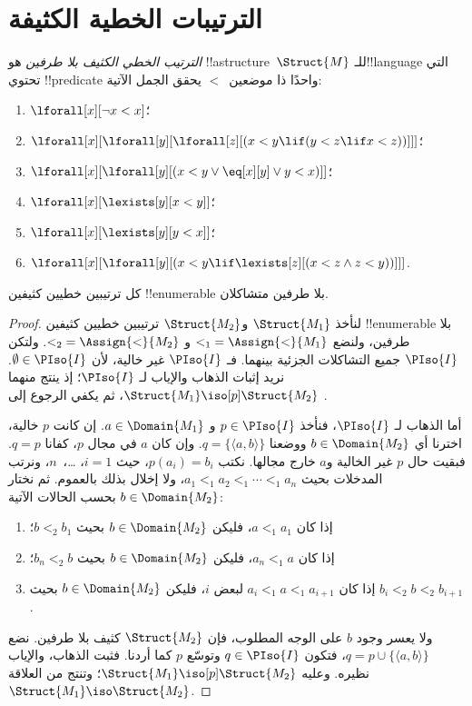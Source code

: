 \documentclass[../../../include/open-logic-section]{subfiles}
\begin{document}
\section{الترتيبات الخطية الكثيفة}

\begin{defn}
  \emph{الترتيب الخطي الكثيف بلا طرفين} هو !!a{structure}~$\Struct{M}$
  للـ!!{language} التي تحتوي !!{predicate} واحدًا ذا موضعين~$<$ يحقق
  الجمل الآتية:
  \begin{enumerate}
  \item $\lforall[x][\lnot x < x]$؛
  \item $\lforall[x][\lforall[y][\lforall[z][(x < y \lif (y < z \lif x
    <z ))]]]$؛
  \item $\lforall[x][\lforall[y][(x< y \lor \eq[x][y] \lor y < x)]]$؛
  \item $\lforall[x][\lexists[y][x < y]]$؛
  \item $\lforall[x][\lexists[y][y < x]]$؛
  \item $\lforall[x][\lforall[y][(x < y \lif \lexists[z][(x < z \land
        z < y))]]]$.
 \end{enumerate}
\end{defn}

\begin{thm}
  كل ترتيبين خطيين كثيفين !!{enumerable} بلا طرفين متشاكلان.
\end{thm}

\begin{proof}
  لنأخذ $\Struct{M_1}$ و$\Struct{M_2}$ ترتيبين خطيين كثيفين
  !!{enumerable} بلا طرفين، ولنضع ${<_1} = \Assign{<}{M_1}$ و
  ${<_2} = \Assign{<}{M_2}$. ولتكن $\PIso{I}$ جميع التشاكلات
  الجزئية بينهما. فـ $\PIso{I}$ غير خالية، لأن
  $\emptyset \in \PIso{I}$. نريد إثبات الذهاب والإياب لـ $\PIso{I}$؛
  إذ ينتج منهما $\Struct{M_1} \iso[p] \Struct{M_2}$، ثم يكفي
  الرجوع إلى .

  أما الذهاب لـ $\PIso{I}$، فنأخذ $p \in \PIso{I}$ و
  $a \in \Domain{M_1}$. إن كانت $p$ خالية، اخترنا أي
  $b \in \Domain{M_2}$ ووضعنا $q = \{\langle a,b\rangle\}$.
  وإن كان $a$ في مجال $p$، كفانا $q=p$. فبقيت حال $p$
  غير الخالية و$a$ خارج مجالها. نكتب $p(a_i)=b_i$، حيث $i=1$،
  \dots،~$n$، ونرتب المدخلات بحيث
  $a_1 <_1 a_2 <_1 \cdots <_1 a_n$، ولا إخلال بذلك بالعموم.
  ثم نختار $b \in \Domain{M_2}$ بحسب الحالات الآتية:
  \begin{enumerate}
  \item إذا كان $a <_1 a_1$، فليكن $b \in \Domain{M_2}$ بحيث
    $b <_2 b_1$؛
  \item إذا كان $a_n <_1 a$، فليكن $b \in \Domain{M_2}$ بحيث
    $b_n <_2 b$؛
 \item إذا كان $a_i <_1 a <_1 a_{i+1}$ لبعض $i$، فليكن
   $b \in \Domain{M_2}$ بحيث $b_i <_2 b <_2 b_{i+1}$.
  \end{enumerate}
  ولا يعسر وجود $b$ على الوجه المطلوب، فإن $\Struct{M_2}$
  كثيف بلا طرفين. نضع $q = p \cup \{ \langle a, b \rangle \}$،
  فتكون $q \in \PIso{I}$ وتوسّع $p$ كما أردنا. فثبت الذهاب،
  والإياب نظيره. وعليه $\Struct{M_1} \iso[p] \Struct{M_2}$؛
  وتنتج من  العلاقة
  $\Struct{M_1} \iso \Struct{M_2}$.
\end{proof}
\end{document}
